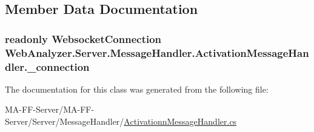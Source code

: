 \subsection{Member Data Documentation}
\hypertarget{class_web_analyzer_1_1_server_1_1_message_handler_1_1_activation_message_handler_a72e20f23d13fafc255e8e860bfe8f8fa}{}
\subsubsection[{\+\_\+connection}]{\setlength{\rightskip}{0pt plus 5cm}readonly {\bf Websocket\+Connection} Web\+Analyzer.\+Server.\+Message\+Handler.\+Activation\+Message\+Handler.\+\_\+connection\hspace{0.3cm}{\ttfamily [private]}}\label{class_web_analyzer_1_1_server_1_1_message_handler_1_1_activation_message_handler_a72e20f23d13fafc255e8e860bfe8f8fa}


The documentation for this class was generated from the following file\+:\begin{DoxyCompactItemize}
\item 
M\+A-\/\+F\+F-\/\+Server/\+M\+A-\/\+F\+F-\/\+Server/\+Server/\+Message\+Handler/\hyperlink{_activationn_message_handler_8cs}{Activationn\+Message\+Handler.\+cs}\end{DoxyCompactItemize}

